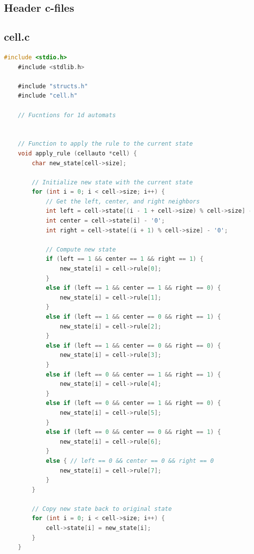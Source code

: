 \documentclass[12pt,a4paper]{article}
\begin{document}
\vspace{1cm}

\subsection{Header c-files}

\subsection*{\small cell.c}
\begin{lstlisting}[caption={\small cell.c},label={lst:p7001},basicstyle=\ttfamily\tiny,language=C]
    #include <stdio.h>
    #include <stdlib.h>

    #include "structs.h"
    #include "cell.h"

    // Fucntions for 1d automats


    // Function to apply the rule to the current state
    void apply_rule (cellauto *cell) {
        char new_state[cell->size];

        // Initialize new state with the current state
        for (int i = 0; i < cell->size; i++) {
            // Get the left, center, and right neighbors
            int left = cell->state[(i - 1 + cell->size) % cell->size] - '0';
            int center = cell->state[i] - '0';
            int right = cell->state[(i + 1) % cell->size] - '0';
            
            // Compute new state
            if (left == 1 && center == 1 && right == 1) {
                new_state[i] = cell->rule[0];
            }
            else if (left == 1 && center == 1 && right == 0) {
                new_state[i] = cell->rule[1];
            }
            else if (left == 1 && center == 0 && right == 1) {
                new_state[i] = cell->rule[2];
            }
            else if (left == 1 && center == 0 && right == 0) {
                new_state[i] = cell->rule[3];
            }
            else if (left == 0 && center == 1 && right == 1) {
                new_state[i] = cell->rule[4];
            }
            else if (left == 0 && center == 1 && right == 0) {
                new_state[i] = cell->rule[5];
            }
            else if (left == 0 && center == 0 && right == 1) {
                new_state[i] = cell->rule[6];
            }
            else { // left == 0 && center == 0 && right == 0
                new_state[i] = cell->rule[7];
            }
        }

        // Copy new state back to original state
        for (int i = 0; i < cell->size; i++) {
            cell->state[i] = new_state[i];
        }
    }


\end{lstlisting}
\end{document}
